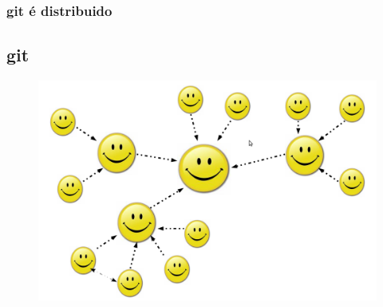 \documentclass{beamer}
\begin{document}

  \begin{frame}
    \frametitle{git é distribuido}
    \subsection{git}
    \begin{figure}[htb]
     \begin{center}
    	\includegraphics[scale=0.2]{descentralizado.png}
     \end{center}
    \end{figure}
    \vfill
  \end{frame}
\end{document}

